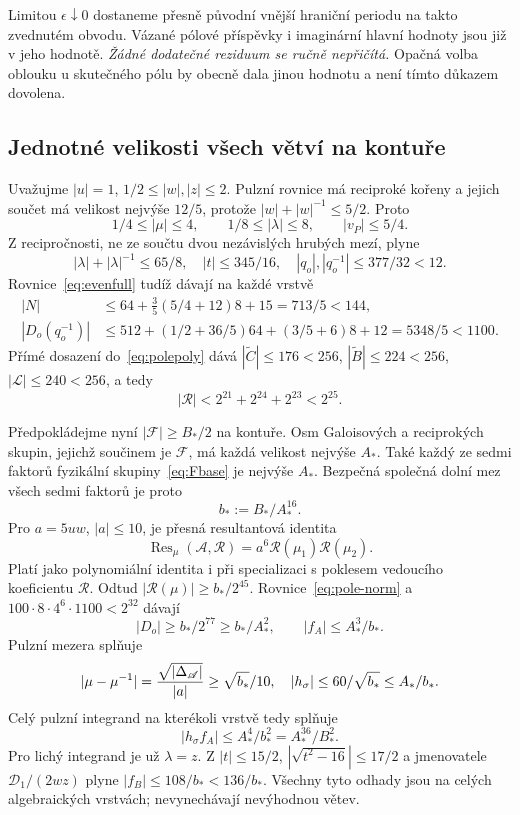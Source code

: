 \documentclass[11pt,a4paper]{article}
\theoremstyle{remark}\newtheorem{remark}[theorem]{Poznámka}
\numberwithin{equation}{section}
\begin{document}
Limitou \(\epsilon\downarrow0\) dostaneme přesně původní vnější hraniční periodu na takto zvednutém obvodu. Vázané pólové příspěvky i imaginární hlavní hodnoty jsou již v jeho hodnotě. \emph{Žádné dodatečné reziduum se ručně nepřičítá.} Opačná volba oblouku u skutečného pólu by obecně dala jinou hodnotu a není tímto důkazem dovolena.

\subsection{Jednotné velikosti všech větví na kontuře}

Uvažujme \(|u|=1\), \(1/2\le|w|,|z|\le2\). Pulzní rovnice má reciproké kořeny a jejich součet má velikost nejvýše \(12/5\), protože \(|w|+|w|^{-1}\le5/2\). Proto
\[
1/4\le|\mu|\le4,\qquad1/8\le|\lambda|\le8,
\qquad |v_P|\le5/4.
\]
Z recipročnosti, ne ze součtu dvou nezávislých hrubých mezí, plyne
\[
|\lambda|+|\lambda|^{-1}\le65/8,
\quad |t|\le345/16,
\quad |q_o|,|q_o^{-1}|\le377/32<12.
\]
Rovnice~\eqref{eq:evenfull} tudíž dávají na každé vrstvě
\begin{align*}
|N|&\le64+\tfrac35(5/4+12)8+15=713/5<144,\\
|D_o(q_o^{-1})|&\le512+(1/2+36/5)64+(3/5+6)8+12
=5348/5<1100.
\end{align*}
Přímé dosazení do~\eqref{eq:polepoly} dává
\(|\widetilde C|\le176<256\), \(|\widetilde B|\le224<256\), \(|\mathscr L|\le240<256\), a tedy
\[
|\mathscr R|<2^{21}+2^{24}+2^{23}<2^{25}.
\]

Předpokládejme nyní \(|\mathscr F|\ge B_*/2\) na kontuře. Osm Galoisových a reciprokých skupin, jejichž součinem je \(\mathscr F\), má každá velikost nejvýše \(A_*\). Také každý ze sedmi faktorů fyzikální skupiny~\eqref{eq:Fbase} je nejvýše \(A_*\). Bezpečná společná dolní mez všech sedmi faktorů je proto
\[
b_*:=B_*/A_*^{16}.
\]
Pro \(a=5uw\), \(|a|\le10\), je přesná resultantová identita
\[
\operatorname{Res}_\mu(\mathscr A,\mathscr R)
=a^6\mathscr R(\mu_1)\mathscr R(\mu_2).
\]
Platí jako polynomiální identita i při specializaci s poklesem vedoucího koeficientu \(\mathscr R\). Odtud \(|\mathscr R(\mu)|\ge b_*/2^{45}\). Rovnice~\eqref{eq:pole-norm} a \(100\cdot8\cdot4^6\cdot1100<2^{32}\) dávají
\[
|D_o|\ge b_*/2^{77}\ge b_*/A_*^2,
\qquad |f_A|\le A_*^3/b_*.
\]
Pulzní mezera splňuje
\[
|\mu-\mu^{-1}|={\sqrt{|\Delta_{\mathscr A}|}\over |a|}
\ge\sqrt{b_*}/10,
\quad |h_\sigma|\le60/\sqrt{b_*}\le A_*/b_*.
\]
Celý pulzní integrand na kterékoli vrstvě tedy splňuje
\begin{equation}
|h_\sigma f_A|\le A_*^4/b_*^2=A_*^{36}/B_*^2.
\label{eq:integrandbound}
\end{equation}
Pro lichý integrand je už \(\lambda=z\). Z \(|t|\le15/2\), \(|\sqrt{t^2-16}|\le17/2\) a jmenovatele \(\mathscr D_1/(2wz)\) plyne \(|f_B|\le108/b_*<136/b_*\). Všechny tyto odhady jsou na celých algebraických vrstvách; nevynechávají nevýhodnou větev.
\end{document}
